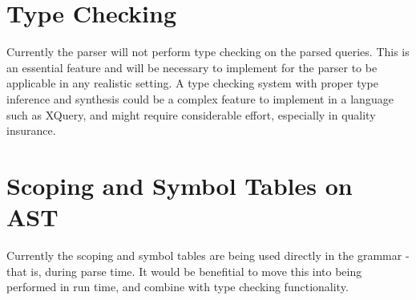 \section{Type Checking}
Currently the parser will not perform type checking on the parsed queries. This
is an essential feature and will be necessary to implement for the parser to be
applicable in any realistic setting. A type checking system with proper type
inference and synthesis could be a complex feature to implement in a language
such as XQuery, and might require considerable effort, especially in quality
insurance. 

\section{Scoping and Symbol Tables on AST}
Currently the scoping and symbol tables are being used directly in the grammar -
that is, during parse time. It would be benefitial to move this into being
performed in run time, and combine with type checking functionality.
